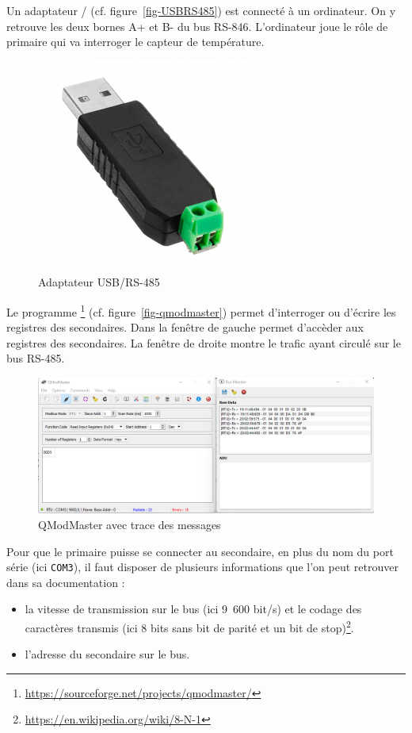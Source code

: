Un adaptateur / (cf. figure~\vref{fig-USBRS485}) est connecté à un ordinateur. On y retrouve les deux bornes A+ et B- du bus RS-846. L'ordinateur joue le rôle de primaire qui va interroger le capteur de température.  

\begin{figure}[tbp]
\centerline{\includegraphics[width=0.3\columnwidth]{Pictures/rs485-usb.png}}
\caption{Adaptateur USB/RS-485}
\label{fig-USBRS485}
\end{figure}

    \vspace{1em}

Le programme \footnote{\url{https://sourceforge.net/projects/qmodmaster/}} (cf. figure~\vref{fig-qmodmaster}) permet d'interroger ou d'écrire les registres des secondaires. Dans la fenêtre de gauche permet d'accèder aux registres des secondaires. La fenêtre de droite montre le trafic ayant circulé sur le bus RS-485.

\begin{figure}[tbp]
\centerline{\includegraphics[width=1\columnwidth]{Pictures/modbus-trace.png}}
\caption{QModMaster avec trace des messages}
\label{fig-qmodmaster}
\end{figure}

Pour que le primaire puisse se connecter au secondaire, en plus du nom du port série (ici \texttt{COM3}), il faut disposer de plusieurs informations que l'on peut retrouver dans sa documentation :

\begin{itemize}
    \item la vitesse de transmission sur le bus (ici 9~600 bit/s) et le codage des caractères transmis (ici 8 bits sans bit de parité et un bit de stop)\footnote{\url{https://en.wikipedia.org/wiki/8-N-1}}.
    \item l'adresse du secondaire sur le bus.
\end{itemize}

